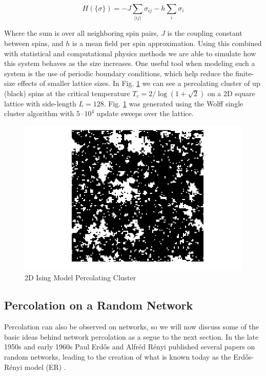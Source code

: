 \begin{equation}
	\label{eqn:Ising_Hamiltonian}
	H(\{\sigma\}) = -J \sum_{\langle i j \rangle} \sigma_{ij} -h \sum_i \sigma_i
\end{equation}

Where the sum is over all neighboring spin pairs, $J$ is the coupling constant between spins, and $h$ is a mean field per spin approximation.
Using this combined with statistical and computational physics methods we are able to simulate how this system behaves as the size increases.
One useful tool when modeling such a system is the use of periodic boundary conditions, which help reduce the finite-size effects of smaller lattice sizes.
In Fig. \ref{fig:Ising_percolation} we can see a percolating cluster of up (black) spins at the critical temperature $T_c = 2 / \log(1 + \sqrt{2})$ on a 2D square lattice with side-length $L = 128$.
Fig. \ref{fig:Ising_percolation} was generated using the Wolff single cluster algorithm with $5 \cdot 10^4$ update sweeps over the lattice.

\begin{figure}[H]
	\centering
	\includegraphics[width=350pt]{images/Ising_128_percolation.png}
	\caption{2D Ising Model Percolating Cluster}
	\label{fig:Ising_percolation}
\end{figure}



\subsection{Percolation on a Random Network}
Percolation can also be observed on networks, so we will now discuss some of the basic ideas behind network percolation as a segue to the next section.
In the late 1950s and early 1960s Paul Erdős and Alfréd Rényi published several papers on random networks, leading to the creation of what is known today as the Erdős-Rényi model (ER) \cite{ER_1} \cite{ER_2}.

